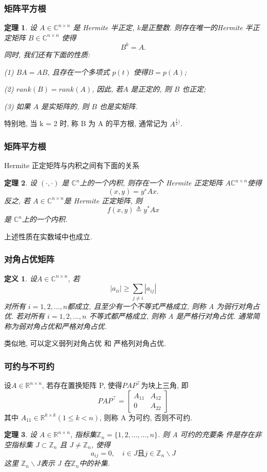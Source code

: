 \documentclass[notheorems,serif]{beamer}
\newcommand{\hei}[1]{{\HEI#1}}
\newtheorem{theorem}{\hei{定理}}
\newtheorem{definition}{\hei{定义}}
\begin{document}
\begin{frame}
\frametitle{矩阵平方根}
\begin{theorem}
	设 $A \in \mathbb{C}^{n \times n}$ 是 Hermite 半正定, $k $是正整数. 则存在唯一的Hermite 半正定矩阵 $B \in \mathbb{C}^{n \times n}$ 使得
	$$B^k = A.$$
	同时, 我们还有下面的性质:
	
	(1) $BA = AB$, 且存在一个多项式 $p(t)$ 使得$ B = p(A)$;
	
	(2) $rank(B) = rank(A)$, 因此, 若$ A$ 是正定的, 则 $B$ 也正定;
	
	(3) 如果 $A$ 是实矩阵的, 则 $B$ 也是实矩阵.
\end{theorem}


特别地, 当 k = 2 时, 称 B 为 A 的平方根, 通常记为 $A^{\frac{1}{2})}$.
\end{frame}

\begin{frame}
\frametitle{矩阵平方根}
Hermite 正定矩阵与内积之间有下面的关系

\begin{theorem}
	设 $(·, ·)$ 是 $\mathbb{C}^n$上的一个内积, 则存在一个 Hermite 正定矩阵 $A  \mathbb{C}^{n \times n}$使得
	$$(x, y) = y^{∗}Ax.$$
	反之, 若 $A \in  \mathbb{C}^{n \times n} $是 Hermite 正定矩阵, 则
	$$
	f(x, y) \triangleq y^{*} A x
	$$
	是 $\mathbb{C}^n $上的一个内积. 
\end{theorem}

 上述性质在实数域中也成立.
\end{frame}

\begin{frame}
\frametitle{对角占优矩阵}
\begin{definition}
	设$ A \in\mathbb{C}^{n \times n}$, 若
	$$
	\left|a_{i i}\right| \geq \sum_{j \neq i}\left|a_{i j}\right|
	$$
	对所有 $i = 1, 2, . . . , n $都成立, 且至少有一个不等式严格成立, 则称 A
	为弱行对角占优. 若对所有 $i = 1, 2, . . . , n$ 不等式都严格成立, 则称 A
	是严格行对角占优. 通常简称为弱对角占优和严格对角占优.	
\end{definition}

类似地, 可以定义弱列对角占优 和 严格列对角占优.
\end{frame}

\begin{frame}
\frametitle{可约与不可约}
设$A \in \mathbb{R}^{n \times n}$, 若存在置换矩阵 P, 使得$P A P^{\top}$为块上三角, 即
$$
P A P^{\top}=\left[\begin{array}{cc}{A_{11}} & {A_{12}} \\ {0} & {A_{22}}\end{array}\right]
$$
其中 $A_{11} \in \mathbb{R}^{k \times k}(1 \leq k<n)$, 则称 A 为可约, 否则不可约.

\begin{theorem}
	设 $A \in \mathbb{R}^{n \times n}$, 指标集$\mathbb{Z}_{n}=\{1,2, \ldots, \ldots, n\}$. 则 A 可约的充要条
	件是存在非空指标集 $J \subset \mathbb{Z}_{n}$ 且 $J \neq \mathbb{Z}_{n}$, 使得
	$$
	a_{i j}=0, \quad i \in J \text{且} j \in \mathbb{Z}_{n} \backslash J
	$$
	这里 $\mathbb{Z}_n \backslash J $表示 J 在$ \mathbb{Z}_n $中的补集.	
\end{theorem}
\end{frame}
\end{document}

